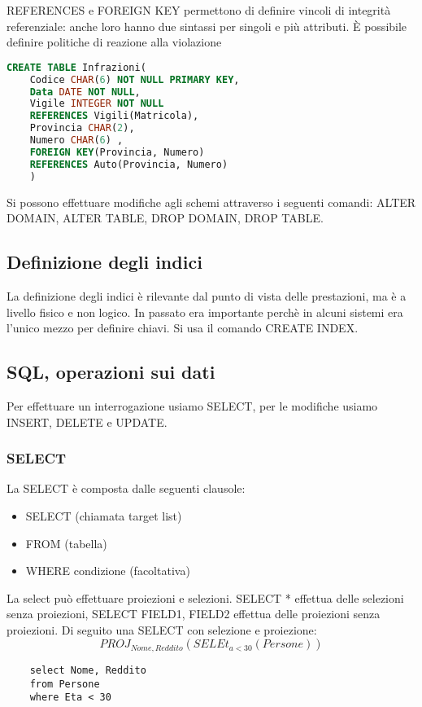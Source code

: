 \documentclass{article}
\begin{document}
REFERENCES e FOREIGN KEY permettono di definire vincoli di
integrità referenziale: anche loro hanno due sintassi per singoli e più attributi. È possibile definire politiche di reazione alla violazione

\begin{center}
    
   \begin{lstlisting}[language=SQL]
    CREATE TABLE Infrazioni(
    Codice CHAR(6) NOT NULL PRIMARY KEY,
    Data DATE NOT NULL,
    Vigile INTEGER NOT NULL
    REFERENCES Vigili(Matricola),
    Provincia CHAR(2),
    Numero CHAR(6) ,
    FOREIGN KEY(Provincia, Numero)
    REFERENCES Auto(Provincia, Numero)
    )
    \end{lstlisting} 
\end{center}

Si possono effettuare modifiche agli schemi attraverso i seguenti comandi: ALTER DOMAIN, ALTER TABLE, DROP DOMAIN, DROP TABLE.
\subsection{Definizione degli indici}
La definizione degli indici è rilevante dal punto di vista delle prestazioni, ma è a livello fisico e non logico. In passato era importante perchè in alcuni sistemi era l'unico mezzo per definire chiavi. Si usa il comando CREATE INDEX.

\subsection{SQL, operazioni sui dati}
Per effettuare un interrogazione usiamo SELECT, per le modifiche usiamo INSERT, DELETE e UPDATE.

\subsubsection{SELECT}
La SELECT è composta dalle seguenti clausole:
\begin{itemize}
    \item SELECT (chiamata target list)
    \item FROM (tabella)
    \item WHERE condizione (facoltativa)
\end{itemize}
La select può effettuare proiezioni e selezioni. SELECT * effettua delle selezioni senza proiezioni, SELECT FIELD1, FIELD2 effettua delle proiezioni senza proiezioni. Di seguito una SELECT con selezione e proiezione:   
\[PROJ_{Nome, Reddito}(SELEt_{a<30}(Persone))\]
\begin{center}
\centering
    \begin{lstlisting}
    select Nome, Reddito
    from Persone
    where Eta < 30
        
    \end{lstlisting}
\end{center}
\end{document}
